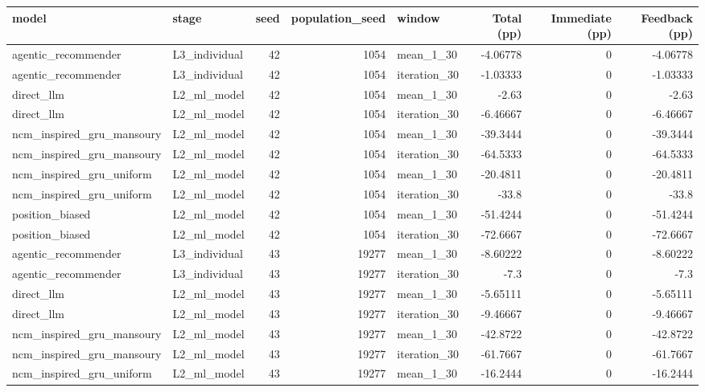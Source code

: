 \begin{table}[htbp!]
\centering
\small
\setlength{\tabcolsep}{3pt}
\renewcommand{\arraystretch}{1.1}
\begin{tabular}{llrrlrrr}
\hline
model & stage & seed & population\_seed & window & Total (pp) & Immediate (pp) & Feedback (pp) \\
\hline
agentic\_recommender & L3\_individual & 42 & 1054 & mean\_1\_30 & -4.06778 & 0 & -4.06778 \\
agentic\_recommender & L3\_individual & 42 & 1054 & iteration\_30 & -1.03333 & 0 & -1.03333 \\
direct\_llm & L2\_ml\_model & 42 & 1054 & mean\_1\_30 & -2.63 & 0 & -2.63 \\
direct\_llm & L2\_ml\_model & 42 & 1054 & iteration\_30 & -6.46667 & 0 & -6.46667 \\
ncm\_inspired\_gru\_mansoury & L2\_ml\_model & 42 & 1054 & mean\_1\_30 & -39.3444 & 0 & -39.3444 \\
ncm\_inspired\_gru\_mansoury & L2\_ml\_model & 42 & 1054 & iteration\_30 & -64.5333 & 0 & -64.5333 \\
ncm\_inspired\_gru\_uniform & L2\_ml\_model & 42 & 1054 & mean\_1\_30 & -20.4811 & 0 & -20.4811 \\
ncm\_inspired\_gru\_uniform & L2\_ml\_model & 42 & 1054 & iteration\_30 & -33.8 & 0 & -33.8 \\
position\_biased & L2\_ml\_model & 42 & 1054 & mean\_1\_30 & -51.4244 & 0 & -51.4244 \\
position\_biased & L2\_ml\_model & 42 & 1054 & iteration\_30 & -72.6667 & 0 & -72.6667 \\
agentic\_recommender & L3\_individual & 43 & 19277 & mean\_1\_30 & -8.60222 & 0 & -8.60222 \\
agentic\_recommender & L3\_individual & 43 & 19277 & iteration\_30 & -7.3 & 0 & -7.3 \\
direct\_llm & L2\_ml\_model & 43 & 19277 & mean\_1\_30 & -5.65111 & 0 & -5.65111 \\
direct\_llm & L2\_ml\_model & 43 & 19277 & iteration\_30 & -9.46667 & 0 & -9.46667 \\
ncm\_inspired\_gru\_mansoury & L2\_ml\_model & 43 & 19277 & mean\_1\_30 & -42.8722 & 0 & -42.8722 \\
ncm\_inspired\_gru\_mansoury & L2\_ml\_model & 43 & 19277 & iteration\_30 & -61.7667 & 0 & -61.7667 \\
ncm\_inspired\_gru\_uniform & L2\_ml\_model & 43 & 19277 & mean\_1\_30 & -16.2444 & 0 & -16.2444 \\

\end{tabular}
\end{table}
